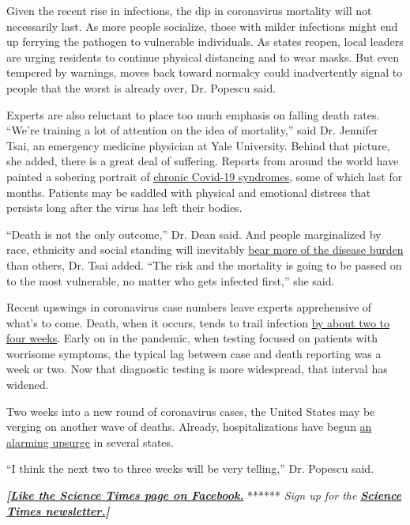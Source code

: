 Given the recent rise in infections, the dip in coronavirus mortality
will not necessarily last. As more people socialize, those with milder
infections might end up ferrying the pathogen to vulnerable individuals.
As states reopen, local leaders are urging residents to continue
physical distancing and to wear masks. But even tempered by warnings,
moves back toward normalcy could inadvertently signal to people that the
worst is already over, Dr. Popescu said.

Experts are also reluctant to place too much emphasis on falling death
rates. ``We're training a lot of attention on the idea of mortality,''
said Dr. Jennifer Tsai, an emergency medicine physician at Yale
University. Behind that picture, she added, there is a great deal of
suffering. Reports from around the world have painted a sobering
portrait of
\href{https://www.nytimes.com/2020/07/01/health/coronavirus-recovery-survivors.html}{chronic
Covid-19 syndromes}, some of which last for months. Patients may be
saddled with physical and emotional distress that persists long after
the virus has left their bodies.

``Death is not the only outcome,'' Dr. Dean said. And people
marginalized by race, ethnicity and social standing will inevitably
\href{https://www.cdc.gov/coronavirus/2019-ncov/covid-data/covidview/index.html}{bear
more of the disease burden} than others, Dr. Tsai added. ``The risk and
the mortality is going to be passed on to the most vulnerable, no matter
who gets infected first,'' she said.

Recent upswings in coronavirus case numbers leave experts apprehensive
of what's to come. Death, when it occurs, tends to trail infection
\href{https://www.cdc.gov/coronavirus/2019-ncov/hcp/clinical-guidance-management-patients.html}{by
about two to four weeks}. Early on in the pandemic, when testing focused
on patients with worrisome symptoms, the typical lag between case and
death reporting was a week or two. Now that diagnostic testing is more
widespread, that interval has widened.

Two weeks into a new round of coronavirus cases, the United States may
be verging on another wave of deaths. Already, hospitalizations have
begun
\href{https://www.washingtonpost.com/nation/2020/06/23/coronavirus-live-updates-us/}{an
alarming upsurge} in several states.

``I think the next two to three weeks will be very telling,'' Dr.
Popescu said.

\textbf{\emph{{[}}\href{http://on.fb.me/1paTQ1h}{\emph{Like the Science
Times page on Facebook.}}} ****** \emph{\textbar{} Sign up for the}
\textbf{\href{http://nyti.ms/1MbHaRU}{\emph{Science Times
newsletter.}}\emph{{]}}}

